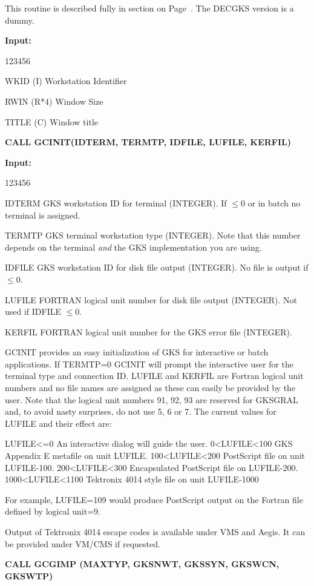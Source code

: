 \begin{OL}
This routine is described fully in section on Page~\pageref{sec:vstnref}.
The DECGKS version is a dummy.
 
{\bf Input:}
\begin{DLtt}{123456}
\item[WKID (I)]Workstation Identifier
\item[RWIN (R*4)]Window Size
\item[TITLE (C)]Window title
\end{DLtt}
\item {\bf CALL GCINIT(IDTERM, TERMTP, IDFILE, LUFILE, KERFIL)}
 
{\bf Input:}
\begin{DLtt}{123456}
\item[IDTERM]GKS workstation ID for terminal (INTEGER).
If $\leq0$ or in batch no terminal is assigned.
\item[TERMTP]GKS terminal workstation type (INTEGER).
Note that this number depends on the terminal {\it and} the
GKS implementation you are using.
\item[IDFILE]GKS workstation ID for disk file output (INTEGER).
No file is output if $\leq0$.
\item[LUFILE]FORTRAN logical unit number for disk file output (INTEGER).
Not used if IDFILE $\leq0$.
\item[KERFIL]FORTRAN logical unit number for the GKS error file (INTEGER).
\end{DLtt}
 
GCINIT provides an easy initialization of GKS for interactive or
batch applications.
If TERMTP=0 GCINIT will prompt the interactive user for the
terminal type and connection ID.
LUFILE and KERFIL are Fortran logical unit numbers and no file names
are assigned as these can easily be provided by the user.
Note that the logical unit numbers 91, 92, 93 are reserved for
GKSGRAL and, to avoid nasty surprises, do not use 5, 6 or 7.
The current values for LUFILE and their effect are:
\begin{XMP}
     LUFILE<=0    An interactive dialog will guide the user.
   0<LUFILE<100   GKS Appendix E metafile on unit LUFILE.
 100<LUFILE<200   PostScript file on unit LUFILE-100.
 200<LUFILE<300   Encapsulated PostScript file on LUFILE-200.
1000<LUFILE<1100  Tektronix 4014 style file on unit LUFILE-1000
\end{XMP}
For example, LUFILE=109 would produce PostScript output on the
Fortran file defined by logical unit=9.
\begin{note}
Output of Tektronix 4014 escape codes is available under VMS and Aegis.
It can be provided under VM/CMS if requested.
\end{note}
\item {\bf CALL GCGIMP (MAXTYP, GKSNWT, GKSSYN, GKSWCN, GKSWTP)}
 

\end{OL}

